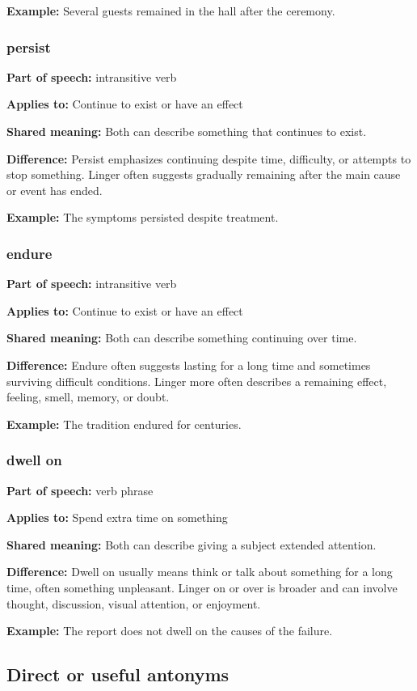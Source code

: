 \documentclass[11pt]{article}
\begin{document}
\textbf{Example:} Several guests remained in the hall after the ceremony.

\subsubsection{persist}
\textbf{Part of speech:} intransitive verb

\textbf{Applies to:} Continue to exist or have an effect

\textbf{Shared meaning:} Both can describe something that continues to exist.

\textbf{Difference:} Persist emphasizes continuing despite time, difficulty, or attempts to stop something. Linger often suggests gradually remaining after the main cause or event has ended.

\textbf{Example:} The symptoms persisted despite treatment.

\subsubsection{endure}
\textbf{Part of speech:} intransitive verb

\textbf{Applies to:} Continue to exist or have an effect

\textbf{Shared meaning:} Both can describe something continuing over time.

\textbf{Difference:} Endure often suggests lasting for a long time and sometimes surviving difficult conditions. Linger more often describes a remaining effect, feeling, smell, memory, or doubt.

\textbf{Example:} The tradition endured for centuries.

\subsubsection{dwell on}
\textbf{Part of speech:} verb phrase

\textbf{Applies to:} Spend extra time on something

\textbf{Shared meaning:} Both can describe giving a subject extended attention.

\textbf{Difference:} Dwell on usually means think or talk about something for a long time, often something unpleasant. Linger on or over is broader and can involve thought, discussion, visual attention, or enjoyment.

\textbf{Example:} The report does not dwell on the causes of the failure.

\subsection{Direct or useful antonyms}
\end{document}
